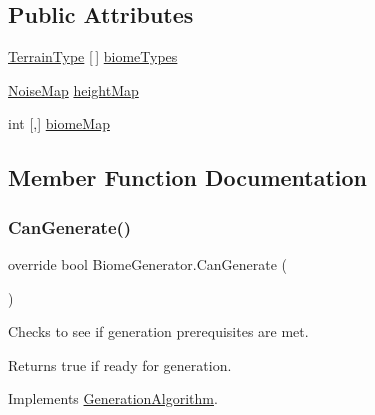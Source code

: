 \subsection*{Public Attributes}
\begin{DoxyCompactItemize}
\item 
\mbox{\hyperlink{struct_terrain_type}{Terrain\+Type}} \mbox{[}$\,$\mbox{]} \mbox{\hyperlink{class_biome_generator_a3ff1f2229659aaf0008f4c3ffd286efe}{biome\+Types}}
\item 
\mbox{\hyperlink{class_noise_map}{Noise\+Map}} \mbox{\hyperlink{class_biome_generator_a26984c4131089a2ad1b9f8a2eb2c3e28}{height\+Map}}
\item 
int \mbox{[},\mbox{]} \mbox{\hyperlink{class_biome_generator_a3fed4e888962415d1e2b758c33c45c81}{biome\+Map}}
\end{DoxyCompactItemize}


\subsection{Member Function Documentation}
\mbox{\label{class_biome_generator_abe3d21283eef52d4c3ae631178ab69fc}} 
\subsubsection{\texorpdfstring{Can\+Generate()}{CanGenerate()}}
{\footnotesize\ttfamily override bool Biome\+Generator.\+Can\+Generate (\begin{DoxyParamCaption}{ }\end{DoxyParamCaption})\hspace{0.3cm}{\ttfamily [virtual]}}



Checks to see if generation prerequisites are met. 

\begin{DoxyReturn}{Returns}
true if ready for generation.
\end{DoxyReturn}


Implements \mbox{\hyperlink{class_generation_algorithm_af7d03e24e3b7fecfe2ae43f06915986d}{Generation\+Algorithm}}.

\mbox{\label{class_biome_generator_aa4113331412728f686a99dfebf78a42e}} 
